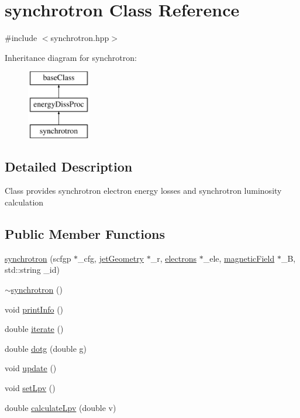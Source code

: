 \hypertarget{classsynchrotron}{\section{synchrotron Class Reference}
\label{classsynchrotron}
}


{\ttfamily \#include $<$synchrotron.\-hpp$>$}

Inheritance diagram for synchrotron\-:\begin{figure}[H]
\begin{center}
\leavevmode
\includegraphics[height=3.000000cm]{classsynchrotron}
\end{center}
\end{figure}


\subsection{Detailed Description}
Class provides synchrotron electron energy losses and synchrotron luminosity calculation \subsection*{Public Member Functions}
\begin{DoxyCompactItemize}
\item 
\hyperlink{classsynchrotron_ab02aaf0264ad332a77524487993e122b}{synchrotron} (scfgp $\ast$\-\_\-cfg, \hyperlink{classjetGeometry}{jet\-Geometry} $\ast$\-\_\-r, \hyperlink{classelectrons}{electrons} $\ast$\-\_\-ele, \hyperlink{classmagneticField}{magnetic\-Field} $\ast$\-\_\-\-B, std\-::string \-\_\-id)
\item 
\hyperlink{classsynchrotron_a5a4aed3b6187a30e25343753ea5e4fa6}{$\sim$synchrotron} ()
\item 
void \hyperlink{classsynchrotron_a6a8610b523a6e3c656372537ad28b756}{print\-Info} ()
\item 
double \hyperlink{classsynchrotron_a0587f0a1da199ec87019a96589fcb58c}{iterate} ()
\item 
double \hyperlink{classsynchrotron_a577e2fa11ba90bf288099e88f02c756f}{dotg} (double g)
\item 
void \hyperlink{classsynchrotron_a52ec26284de15395bd203037024b7ae4}{update} ()
\item 
void \hyperlink{classsynchrotron_adf30d0e7cbba05a39a16b60957d02321}{set\-Lpv} ()
\item 
double \hyperlink{classsynchrotron_ab12acf6ee2bdc60011e2739ba42cd32a}{calculate\-Lpv} (double v)
\end{DoxyCompactItemize}
